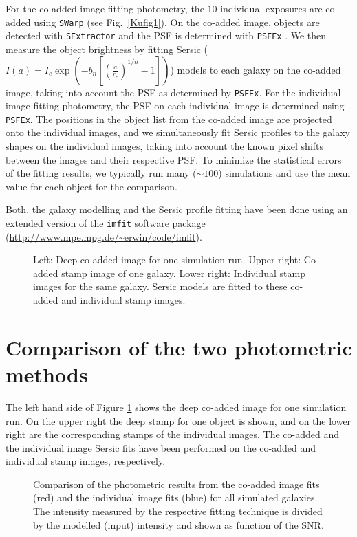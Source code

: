 For the co-added image
fitting photometry, the $10$ individual exposures are co-added using {\tt SWarp}
(see Fig.\ \ref{Kufig1}). On the co-added image,
objects are detected with {\tt SExtractor} and the PSF is determined
with {\tt PSFEx} \citep{2011ASPC..442..435B}.
We then measure the object brightness by fitting
Sersic ($I(a) = I_e \exp(-b_n[(\frac{a}{r_e})^{1/n}-1])$)
models to each galaxy on the co-added image, taking into account the PSF as determined
by {\tt PSFEx}.
For the individual image fitting photometry, the PSF on each individual image is determined using
{\tt PSFEx}. The positions in the object list from the co-added image are projected onto the
individual images, and we simultaneously fit Sersic profiles to the galaxy shapes on the individual images,
taking into account the known pixel shifts between the images and their respective PSF.
To minimize the statistical errors of the fitting results, we typically run many ($\sim100$)
simulations and use the mean value for each object for the comparison.

Both, the galaxy modelling and the Sersic profile fitting have been done using an extended
version of the {\tt imfit} software
package (\url{http://www.mpe.mpg.de/~erwin/code/imfit}).
\begin{figure}[t]
\caption{Left: Deep co-added image for one simulation run. Upper right: Co-added stamp image
of one galaxy. Lower right: Individual stamp images for the same galaxy. Sersic models are fitted
to these co-added and individual stamp images.}
\label{fig2}
\end{figure}
\section{Comparison of the two photometric methods}
The left hand side of Figure \ref{fig2} shows the deep co-added image for one simulation run.
On the upper right the deep stamp for one object is shown, and on the lower right
are the corresponding stamps of the individual images. The co-added and the individual
image Sersic fits have been performed on the co-added and individual stamp images, respectively.
\begin{figure}[t]
\caption{Comparison of the photometric results from the co-added image fits (red) and the
individual image fits (blue) for all simulated galaxies. The intensity measured by the respective
fitting technique is divided by the modelled (input) intensity and shown as function of the
SNR.}
\label{fig3}
\end{figure}

